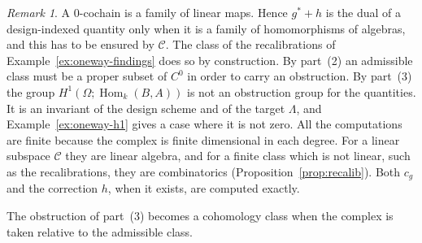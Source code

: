 \documentclass[11pt,a4paper]{article}
\theoremstyle{plain}
\theoremstyle{definition}
\theoremstyle{remark}
\newtheorem{remark}[theorem]{Remark}
\newcommand{\cat}[1]{\mathsf{#1}}
\newcommand{\catO}{\cat{\Omega}}
\DeclareMathOperator{\Hom}{Hom}
\begin{document}
\begin{remark}\label{rem:obstruction}
A $0$-cochain is a family of linear maps. Hence $g^{*}+h$ is the dual of a
design-indexed quantity only when it is a family of homomorphisms of algebras,
and this has to be ensured by $\mathcal{C}$. The class of the recalibrations
of Example~\ref{ex:oneway-findings} does so by construction. By part~(2) an
admissible class must be a proper subset of $C^{0}$ in order to carry an
obstruction. By part~(3) the group $H^{1}(\catO;\Hom_k(B,A))$ is not an
obstruction group for the quantities. It is an invariant of the design scheme
and of the target $\Lambda$, and Example~\ref{ex:oneway-h1} gives a case where
it is not zero. All the computations are finite because the complex is finite
dimensional in each degree. For a linear subspace $\mathcal{C}$ they are
linear algebra, and for a finite class which is not linear, such as the
recalibrations, they are combinatorics (Proposition~\ref{prop:recalib}). Both
$c_g$ and the correction $h$, when it exists, are computed exactly.
\end{remark}

The obstruction of part~(3) becomes a cohomology class when the complex is
taken relative to the admissible class.
\end{document}
